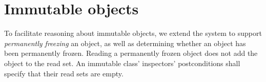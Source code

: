 \documentclass{article}
\begin{document}
\section{Immutable objects}

To facilitate reasoning about immutable objects, we extend the system to support \emph{permanently freezing} an object, as well as determining whether an object has been permanently frozen. Reading a permanently frozen object does not add the object to the read set. An immutable class' inspectors' postconditions shall specify that their read sets are empty.
\end{document}
